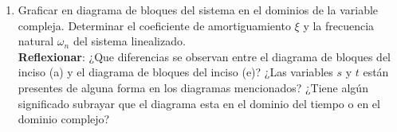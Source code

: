 \documentclass[12pt,a4paper]{report}
\begin{document}
\begin{enumerate}[label=\alph*)]
  \item Graficar en diagrama de bloques del sistema en el dominios de la variable compleja.  Determinar el coeficiente
    de amortiguamiento $\xi$ y la frecuencia natural $\omega_n$ del sistema linealizado.\\
    \textbf{Reflexionar}: ¿Que diferencias se observan entre el diagrama de bloques del inciso (a) y el diagrama de
    bloques del inciso (e)? ¿Las variables $s$ y $t$ están presentes de alguna forma en los diagramas mencionados? ¿Tiene
    algún significado subrayar que el diagrama esta en el dominio del tiempo o en el dominio complejo?

  \end{enumerate}
\end{document}
